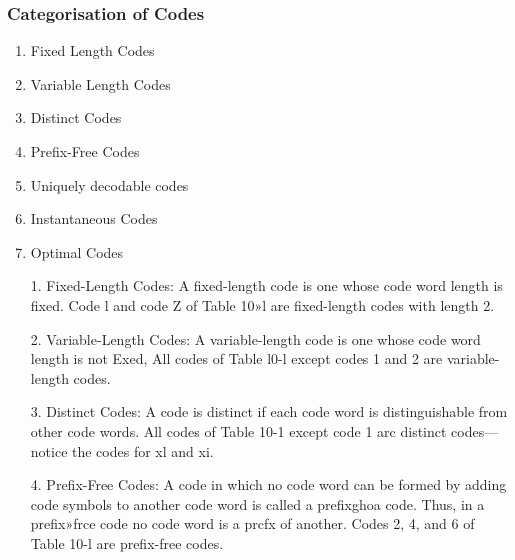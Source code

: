 \documentclass[a4]{beamer}
\begin{document}
\begin{frame}
\frametitle{Categorisation of Codes}
\begin{enumerate}
\item Fixed Length Codes
\item Variable Length Codes
\item Distinct Codes
\item Prefix-Free Codes
\item Uniquely decodable codes
\item Instantaneous Codes
\item Optimal Codes
\end{enumerate}
\end{frame}
\begin{frame}
\begin{itemize}
\item[1.] Fixed-Length Codes: A fixed-length code is one whose code word length is fixed. Code l and code Z of Table 10»l are
fixed-length codes with length 2.
\item[2.] Variable-Length Codes: A variable-length code is one whose code word length is not Exed, All codes of Table l0-l except
codes 1 and 2 are variable-length codes.
\item[3.] Distinct Codes:
A code is distinct if each code word is distinguishable from other code words. All codes of Table
10-1 except code 1 arc distinct codes—notice the codes for xl and xi.
\item[4.] Prefix-Free Codes:
A code in which no code word can be formed by adding code symbols to another code word is
called a prefixghoa code. Thus, in a prefix»frce code no code word is a prcfx of another. Codes 2, 4,
and 6 of Table 10-l are prefix-free codes.
\end{itemize}
\end{frame}
\end{document}
